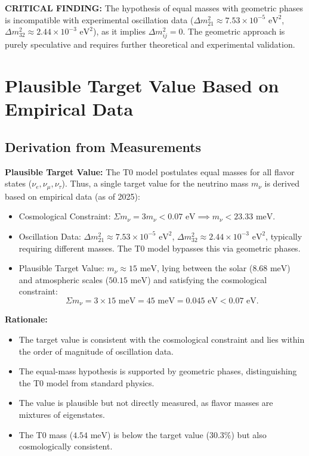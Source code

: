 \documentclass[12pt,a4paper]{article}
\begin{document}
	\begin{warning}
		\textbf{CRITICAL FINDING:} The hypothesis of equal masses with geometric phases is incompatible with experimental oscillation data (\(\Delta m^2_{21} \approx 7.53 \times 10^{-5} \text{ eV}^2\), \(\Delta m^2_{32} \approx 2.44 \times 10^{-3} \text{ eV}^2\)), as it implies \(\Delta m^2_{ij} = 0\). The geometric approach is purely speculative and requires further theoretical and experimental validation.
	\end{warning}
	
	\section{Plausible Target Value Based on Empirical Data}
	
	\subsection{Derivation from Measurements}
	
	\begin{experimental}
		\textbf{Plausible Target Value:}
		The T0 model postulates equal masses for all flavor states (\(\nu_e, \nu_\mu, \nu_\tau\)). Thus, a single target value for the neutrino mass \(m_\nu\) is derived based on empirical data (as of 2025):
		\begin{itemize}
			\item Cosmological Constraint: \(\Sigma m_\nu = 3 m_\nu < 0.07 \text{ eV} \implies m_\nu < 23.33 \text{ meV}\).
			\item Oscillation Data: \(\Delta m^2_{21} \approx 7.53 \times 10^{-5} \text{ eV}^2\), \(\Delta m^2_{32} \approx 2.44 \times 10^{-3} \text{ eV}^2\), typically requiring different masses. The T0 model bypasses this via geometric phases.
			\item Plausible Target Value: \(m_\nu \approx 15 \text{ meV}\), lying between the solar (\(8.68 \text{ meV}\)) and atmospheric scales (\(50.15 \text{ meV}\)) and satisfying the cosmological constraint:
			\[
			\Sigma m_\nu = 3 \times 15 \text{ meV} = 45 \text{ meV} = 0.045 \text{ eV} < 0.07 \text{ eV}.
			\]
		\end{itemize}
		
		\textbf{Rationale:}
		\begin{itemize}
			\item The target value is consistent with the cosmological constraint and lies within the order of magnitude of oscillation data.
			\item The equal-mass hypothesis is supported by geometric phases, distinguishing the T0 model from standard physics.
			\item The value is plausible but not directly measured, as flavor masses are mixtures of eigenstates.
			\item The T0 mass (\(4.54 \text{ meV}\)) is below the target value (\(30.3\%\)) but also cosmologically consistent.
		\end{itemize}
	\end{experimental}
	
\end{document}

